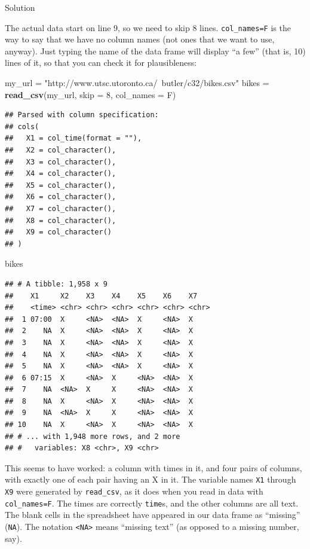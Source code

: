 \documentclass[]{tufte-book}
\newenvironment{Shaded}{}{}
\newcommand{\DataTypeTok}[1]{\textcolor[rgb]{0.56,0.13,0.00}{#1}}
\newcommand{\DecValTok}[1]{\textcolor[rgb]{0.25,0.63,0.44}{#1}}
\newcommand{\KeywordTok}[1]{\textcolor[rgb]{0.00,0.44,0.13}{\textbf{#1}}}
\newcommand{\NormalTok}[1]{#1}
\newcommand{\StringTok}[1]{\textcolor[rgb]{0.25,0.44,0.63}{#1}}
\theoremstyle{definition}
\theoremstyle{definition}
\theoremstyle{definition}
\theoremstyle{remark}
\begin{document}
Solution

The actual data start on line 9, so we need to skip 8 lines.
\texttt{col\_names=F} is the way to say that we have no column names
(not ones that we want to use, anyway). Just typing the name of the data
frame will display ``a few'' (that is, 10) lines of it, so that you can
check it for plausibleness:

\begin{Shaded}
\begin{Highlighting}[]
\NormalTok{my_url =}\StringTok{ "http://www.utsc.utoronto.ca/~butler/c32/bikes.csv"}
\NormalTok{bikes =}\StringTok{ }\KeywordTok{read_csv}\NormalTok{(my_url, }\DataTypeTok{skip =} \DecValTok{8}\NormalTok{, }\DataTypeTok{col_names =}\NormalTok{ F)}
\end{Highlighting}
\end{Shaded}

\begin{verbatim}
## Parsed with column specification:
## cols(
##   X1 = col_time(format = ""),
##   X2 = col_character(),
##   X3 = col_character(),
##   X4 = col_character(),
##   X5 = col_character(),
##   X6 = col_character(),
##   X7 = col_character(),
##   X8 = col_character(),
##   X9 = col_character()
## )
\end{verbatim}

\begin{Shaded}
\begin{Highlighting}[]
\NormalTok{bikes}
\end{Highlighting}
\end{Shaded}

\begin{verbatim}
## # A tibble: 1,958 x 9
##    X1     X2    X3    X4    X5    X6    X7   
##    <time> <chr> <chr> <chr> <chr> <chr> <chr>
##  1 07:00  X     <NA>  <NA>  X     <NA>  X    
##  2    NA  X     <NA>  <NA>  X     <NA>  X    
##  3    NA  X     <NA>  <NA>  X     <NA>  X    
##  4    NA  X     <NA>  <NA>  X     <NA>  X    
##  5    NA  X     <NA>  <NA>  X     <NA>  X    
##  6 07:15  X     <NA>  X     <NA>  <NA>  X    
##  7    NA  <NA>  X     X     <NA>  <NA>  X    
##  8    NA  X     <NA>  X     <NA>  <NA>  X    
##  9    NA  <NA>  X     X     <NA>  <NA>  X    
## 10    NA  X     <NA>  X     <NA>  <NA>  X    
## # ... with 1,948 more rows, and 2 more
## #   variables: X8 <chr>, X9 <chr>
\end{verbatim}

This seems to have worked: a column with times in it, and four pairs of
columns, with exactly one of each pair having an X in it. The variable
names \texttt{X1} through \texttt{X9} were generated by
\texttt{read\_csv}, as it does when you read in data with
\texttt{col\_names=F}. The times are correctly \texttt{time}s, and the
other columns are all text. The blank cells in the spreadsheet have
appeared in our data frame as ``missing'' (\texttt{NA}). The notation
\texttt{\textless{}NA\textgreater{}} means ``missing text'' (as opposed
to a missing number, say).
\end{document}
